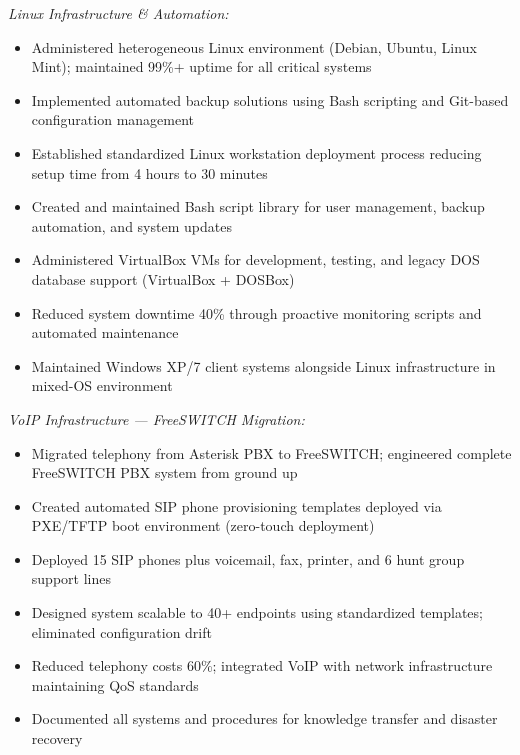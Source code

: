 \documentclass[9pt,letterpaper]{extarticle}
\begin{document}
\smallskip\textit{Linux Infrastructure \& Automation:}
\begin{itemize}
  \item Administered heterogeneous Linux environment (Debian, Ubuntu, Linux Mint); maintained 99\%+ uptime for all critical systems
  \item Implemented automated backup solutions using Bash scripting and Git-based configuration management
  \item Established standardized Linux workstation deployment process reducing setup time from 4 hours to 30 minutes
  \item Created and maintained Bash script library for user management, backup automation, and system updates
  \item Administered VirtualBox VMs for development, testing, and legacy DOS database support (VirtualBox + DOSBox)
  \item Reduced system downtime 40\% through proactive monitoring scripts and automated maintenance
  \item Maintained Windows XP/7 client systems alongside Linux infrastructure in mixed-OS environment
\end{itemize}

\textit{VoIP Infrastructure --- FreeSWITCH Migration:}
\begin{itemize}
  \item Migrated telephony from Asterisk PBX to FreeSWITCH; engineered complete FreeSWITCH PBX system from ground up
  \item Created automated SIP phone provisioning templates deployed via PXE/TFTP boot environment (zero-touch deployment)
  \item Deployed 15 SIP phones plus voicemail, fax, printer, and 6 hunt group support lines
  \item Designed system scalable to 40+ endpoints using standardized templates; eliminated configuration drift
  \item Reduced telephony costs 60\%; integrated VoIP with network infrastructure maintaining QoS standards
  \item Documented all systems and procedures for knowledge transfer and disaster recovery
\end{itemize}
\end{document}
